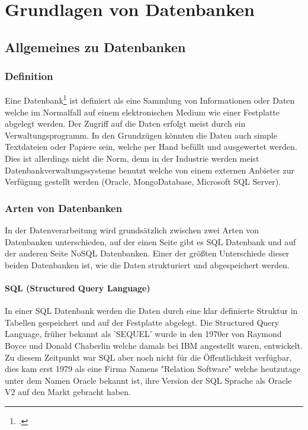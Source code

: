 \chapter{Grundlagen von Datenbanken}
\bauer
\section{Allgemeines zu Datenbanken}
\subsection{Definition}
Eine Datenbank\footcite{oracle} ist definiert als eine Sammlung von Informationen oder Daten welche im Normalfall auf einem elektronischen Medium wie einer Festplatte abgelegt werden. 
Der Zugriff auf die Daten erfolgt meist durch ein Verwaltungsprogramm. In den Grundzügen könnten die Daten auch simple Textdateien oder Papiere sein, welche per Hand befüllt und ausgewertet werden. 
Dies ist allerdings nicht die Norm, denn in der Industrie werden meist Datenbankverwaltungssysteme benutzt welche von einem externen Anbieter zur Verfügung gestellt werden (Oracle, MongoDatabase, Microsoft SQL Server).	
\subsection{Arten von Datenbanken}
In der Datenverarbeitung wird grundsätzlich zwischen zwei Arten von Datenbanken unterschieden, auf der einen Seite gibt es SQL Datenbank und auf der anderen Seite NoSQL Datenbanken. 
Einer der größten Unterschiede dieser beiden Datenbanken ist, wie die Daten strukturiert und abgespeichert werden.
\subsubsection{SQL (Structured Query Language)} 
In einer SQL Datenbank werden die Daten durch eine klar definierte Struktur in Tabellen gespeichert und auf der Festplatte abgelegt. 
Die Structured Query Language, früher bekannt als 'SEQUEL' wurde in den 1970er von Raymond Boyce und Donald Chaberlin welche damals bei IBM angestellt waren, entwickelt. 
Zu diesem Zeitpunkt war SQL aber noch nicht für die Öffentlichkeit verfügbar, dies kam erst 1979 als eine Firma Namens "Relation Software" welche heutzutage unter dem Namen Oracle bekannt ist, ihre Version der SQL Sprache als Oracle V2 auf den Markt gebracht haben.
